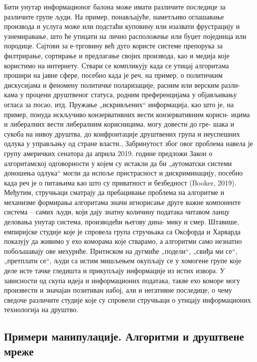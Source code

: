\documentclass[a4paper]{article}
\begin{document}
Бити унутар информационог балона може имати различите последице за различите групе људи. На пример, понављајуће, наметљиво оглашавање производа и услуга може или подстаћи куповину или изазвати фрустрацију и узнемиравање, што ће утицати на лично расположење или буџет појединца или породице. Сајтови за е-трговину већ дуго користе системе препорука за филтрирање, сортирање и предлагање својих производа, као и медија које користимо на интернету. Ствари се компликују када се утицај алгоритама прошири на јавне сфере, посебно када је реч, на пример, о политичким дискусијама и феномену политичке поларизације, расним или верским разли-
кама у процени друштвеног статуса, родним преференцијама у објављивању огласа за посао, итд. Пружање „искривљених“ информација, као што је, на пример, понуда искључиво конзервативних вести конзервативним корисн-
ицима и либералних вести либералним корисницима, могу довести до гре-
шака и сукоба на нивоу друштва, до конфронтације друштвених група и неуспешних одлука у управљању од стране власти., Забринутост због овог проблема навела је групу америчких сенатора да априла 2019. године предложи Закон о алгоритамској одговорности у којем су истакли да би „аутоматски системи доношења одлука“ могли да испоље пристрасност и дискриминацију, посебно када реч је о питањима као што су приватност и безбедност (Booker, 2019). Међутим, стручњаци сматрају да пребацивање проблема на алгоритме и механизме формирања алгоритама значи игнорисање друге важне компоненте система – самих људи, који дају знатну количину података читавом ланцу деловања унутар система, производећи његову дина-
мику и смер\cite{miller}. Штавише, емпиријске студије које је спровела група стручњака са Оксфорда и Харварда показују да живимо у ехо коморама које стварамо, а алгоритми само незнатно побољшавају ове мехуриће. Притиском на дугмиће „подели“, „свиђа ми се“, „претплати се“, људи са истим мишљењем окупљају се у хомогене групе које деле исте тачке гледишта и прикупљају информације из истих извора. У зависности од скупа идеја и информационих података, такве ехо коморе могу произвести и значајан позитиван набој, али и негативне последице, о чему сведоче различите студије које су спровели стручњаци о утицају информационих технологија на друштво.



\subsection{Примери манипулације. Алгоритми и друштвене мреже}
\label{subsec:podnaslov6}
\end{document}

